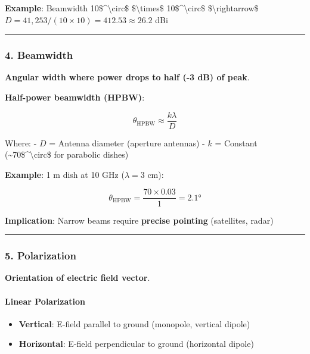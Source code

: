 \textbf{Example}: Beamwidth 10\$\^{}\textbackslash circ\$
\$\textbackslash times\$ 10\$\^{}\textbackslash circ\$
\$\textbackslash rightarrow\$
\(D = 41,253 / (10 \times 10) = 412.53 \approx 26.2\) dBi

\begin{center}\rule{0.5\linewidth}{0.5pt}\end{center}

\subsubsection{4. Beamwidth}\label{beamwidth}

\textbf{Angular width where power drops to half (-3 dB) of peak}.

\textbf{Half-power beamwidth (HPBW)}:

\[
\theta_{\text{HPBW}} \approx \frac{k \lambda}{D}
\]

Where: - \(D\) = Antenna diameter (aperture antennas) - \(k\) = Constant
(\textasciitilde70\$\^{}\textbackslash circ\$ for parabolic dishes)

\textbf{Example}: 1 m dish at 10 GHz (\(\lambda = 3\) cm):

\[
\theta_{\text{HPBW}} = \frac{70 \times 0.03}{1} = 2.1°
\]

\textbf{Implication}: Narrow beams require \textbf{precise pointing}
(satellites, radar)

\begin{center}\rule{0.5\linewidth}{0.5pt}\end{center}

\subsubsection{5. Polarization}\label{polarization}

\textbf{Orientation of electric field vector}.

\paragraph{Linear Polarization}\label{linear-polarization}

\begin{itemize}
\tightlist
\item
  \textbf{Vertical}: E-field parallel to ground (monopole, vertical
  dipole)
\item
  \textbf{Horizontal}: E-field perpendicular to ground (horizontal
  dipole)
\end{itemize}

